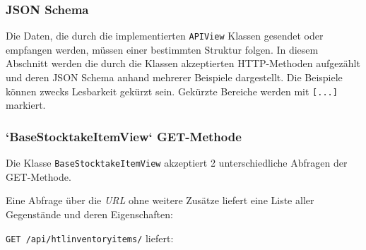 \hypertarget{json-schema}{%
\subsubsection{JSON Schema}\label{json-schema}}

Die Daten, die durch die implementierten \texttt{APIView} Klassen
gesendet oder empfangen werden, müssen einer bestimmten Struktur folgen.
In diesem Abschnitt werden die durch die Klassen akzeptierten
HTTP-Methoden \cite{rest-http-methods} aufgezählt und deren JSON Schema
anhand mehrerer Beispiele dargestellt. Die Beispiele können zwecks
Lesbarkeit gekürzt sein. Gekürzte Bereiche werden mit \texttt{{[}...{]}}
markiert.

\subsubsection*{`BaseStocktakeItemView` GET-Methode}

Die Klasse \texttt{BaseStocktakeItemView} akzeptiert 2 unterschiedliche
Abfragen der GET-Methode.

Eine Abfrage über die \emph{URL}
 ohne weitere Zusätze
liefert eine Liste aller Gegenstände und deren Eigenschaften:

\texttt{GET\ /api/htlinventoryitems/} liefert:

\begin{Shaded}
\begin{Highlighting}[]
\FunctionTok{\{}
    \FunctionTok{:} \OtherTok{[}\FunctionTok{\{}
            \FunctionTok{:} \FunctionTok{,}
            \FunctionTok{:} \FunctionTok{,}
            \FunctionTok{:} \FunctionTok{,}
            \FunctionTok{:} \FunctionTok{,}
            \FunctionTok{:} \FunctionTok{,}
            \FunctionTok{:} \FunctionTok{\{}
                \FunctionTok{:} \FunctionTok{,}
                \ErrorTok{[...]}
            \FunctionTok{\},}
            \FunctionTok{:} \OtherTok{[]}
        \FunctionTok{\}}\OtherTok{,}
        \OtherTok{[}\OtherTok{]}
    \OtherTok{]}
\FunctionTok{\}}
\end{Highlighting}
\end{Shaded}

